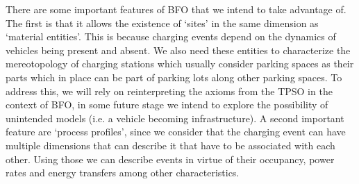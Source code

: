 There are some important features of BFO that we intend to take advantage of.
The first is that it allows the existence of `sites' in the same dimension as
`material entities'. This is because charging events depend on the dynamics of
vehicles being present and absent. We also need these entities to characterize
the mereotopology of charging stations which usually consider parking spaces as
their parts which in place can be part of parking lots along other parking
spaces. To address this, we will rely on reinterpreting the axioms from the
TPSO in the context of BFO, in some future stage we intend to explore the
possibility of unintended models (i.e. a vehicle becoming infrastructure). A
second important feature are `process profiles', since we consider that the
charging event can have multiple dimensions that can describe it that have to
be associated with each other. Using those we can describe events in virtue of
their occupancy, power rates and energy transfers among other characteristics.
